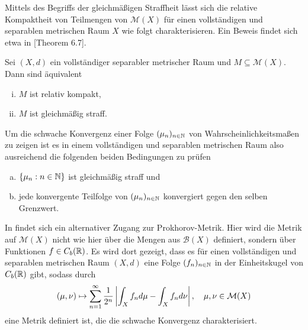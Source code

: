 Mittels des Begriffs der gleichmäßigen Straffheit lässt sich die relative Kompaktheit von Teilmengen von $\mathcal{M}(X)$ für einen vollständigen und separablen metrischen Raum $X$ wie folgt charakterisieren. Ein Beweis findet sich etwa in \cite{parthasarathy}[Theorem 6.7]. 

\begin{theorem}
    Sei $(X,d)$ ein vollständiger separabler metrischer Raum und $M \subseteq \mathcal{M}(X)$. Dann sind äquivalent
    \begin{enumerate}[(i)]
        \item $M$ ist relativ kompakt,
        \item $M$ ist gleichmäßig straff. 
    \end{enumerate}
\end{theorem}

Um die schwache Konvergenz einer Folge $(\mu_n)_{n \in \mathbb{N}}$ von Wahrscheinlichkeitsmaßen zu zeigen ist es in einem vollständigen und separablen metrischen Raum also ausreichend die folgenden beiden Bedingungen zu prüfen
\begin{enumerate}[(a)]
    \item $\{\mu_n: n \in \mathbb{N}\}$ ist gleichmäßig straff und
    \item jede konvergente Teilfolge von $(\mu_n)_{n \in \mathbb{N}}$ konvergiert gegen den selben Grenzwert.
\end{enumerate}

\begin{remark}
    In \cite{li-queffelec} findet sich ein alternativer Zugang zur Prokhorov-Metrik. Hier wird die Metrik auf $\mathcal{M}(X)$ nicht wie hier über die Mengen aus $\mathcal{B}(X)$ definiert, sondern über Funktionen $f \in C_b(\mathbb{R})$.
    Es wird dort gezeigt, dass es für einen vollständigen und separablen metrischen Raum $(X,d)$ eine Folge $(f_n)_{n \in \mathbb{N}}$ in der Einheitskugel von $C_b(\mathbb{R})$ gibt, sodass durch
    $$
        (\mu, \nu) \mapsto \sum_{n=1}^{\infty}\frac{1}{2^n}\left| \int_Xf_nd\mu - \int_X f_n d\nu \right|, \quad \mu, \nu \in \mathcal{M}(X)
    $$
    eine Metrik definiert ist, die die schwache Konvergenz charakterisiert. 
\end{remark}
